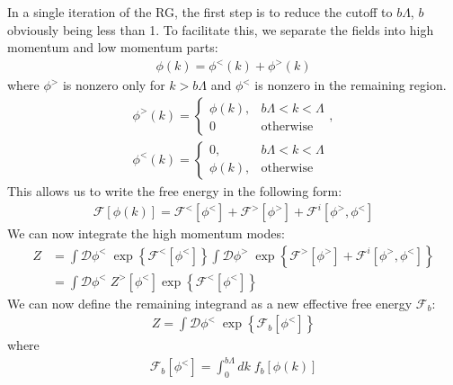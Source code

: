 \documentclass[12pt]{article}
\begin{document}
In a single iteration of the RG, the first step is to reduce the cutoff to \(b\Lambda\), \(b\) obviously being less than 1. To facilitate this, we separate the fields into high momentum and low momentum parts:
\begin{equation}\begin{aligned}
\phi(k) = \phi^<(k) + \phi^>(k)
\end{aligned}\end{equation}
where \(\phi^>\) is nonzero only for \(k>b\Lambda\) and \(\phi^<\) is nonzero in the remaining region.
\begin{equation}\begin{aligned}
\phi^>(k) = \begin{cases} \phi(k), &b\Lambda < k <\Lambda\\ 0 &\text{otherwise} \end{cases},\\
\phi^<(k) = \begin{cases} 0, &b\Lambda < k <\Lambda\\ \phi(k), &\text{otherwise} \end{cases}
\end{aligned}\end{equation}
This allows us to write the free energy in the following form:
\begin{equation}\begin{aligned}
\mathcal{F}[\phi(k)] = \mathcal{F}^<[\phi^<] + \mathcal{F}^>[\phi^>] + \mathcal{F}^i[\phi^>,\phi^<]
\end{aligned}\end{equation}
We can now integrate the high momentum modes:
\begin{equation}\begin{aligned}
	Z &= \int \mathcal{D}\phi^<\; \exp\left\{\mathcal{F}^<[\phi^<]\right\}\int \mathcal{D}\phi^>\;\exp\left\{\mathcal{F}^>[\phi^>] + \mathcal{F}^i[\phi^>,\phi^<]\right\}\\
	  &=\int \mathcal{D}\phi^<\; Z^>[\phi^<]\exp\left\{\mathcal{F}^<[\phi^<]\right\}
\end{aligned}\end{equation}
We can now define the remaining integrand as a new effective free energy \(\mathcal{F}_b\):
\begin{equation}\begin{aligned}
	Z  =\int \mathcal{D}\phi^<\; \exp\left\{\mathcal{F}_b[\phi^<]\right\}
\end{aligned}\end{equation}
where
\begin{equation}\begin{aligned}
\mathcal{F}_b[\phi^<] = \int_0^{b\Lambda} dk\;{f_b}[\phi(k)]
\end{aligned}\end{equation}
\end{document}
